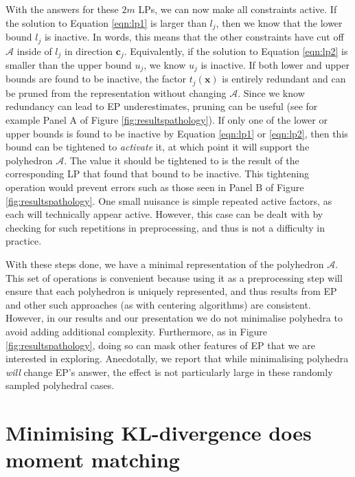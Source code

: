 \documentclass[twoside,11pt]{article}
\def\x{{\mathbf x}}
\def\c{{\mathbf c}}
\def\regionA{\mathcal{A}}
\begin{document}
With the answers for these $2m$ LPs, we can now make all constraints active.  If the solution to Equation \ref{eqn:lp1} is larger than $l_j$, then we know that the lower bound $l_j$ is inactive.  In words, this means that the other constraints have cut off $\regionA$ inside of $l_j$ in direction $\c_j$.  Equivalently, if the solution to Equation \ref{eqn:lp2} is smaller than the upper bound $u_j$, we know $u_j$ is inactive.  If both lower and upper bounds are found to be inactive, the factor $t_j(\x)$ is entirely redundant and can be pruned from the representation without changing $\regionA$.  Since we know redundancy can lead to EP underestimates, pruning can be useful (see for example Panel A of Figure \ref{fig:resultspathology}).  If only one of the lower or upper bounds is found to be inactive by Equation \ref{eqn:lp1} or \ref{eqn:lp2}, then this bound can be tightened to {\it activate} it, at which point it will support the polyhedron $\regionA$.   The value it should be tightened to is the result of the corresponding LP that found that bound to be inactive.  This tightening operation would prevent errors such as those seen in Panel B of Figure \ref{fig:resultspathology}.  One small nuisance is simple repeated active factors, as each will technically appear active.  However, this case can be dealt with by checking for such repetitions in preprocessing, and thus is not a difficulty in practice.  

With these steps done, we have a minimal representation of the polyhedron $\regionA$.  This set of operations is convenient because using it as a preprocessing step will ensure that each polyhedron is uniquely represented, and thus results from EP and other such approaches (as with centering algorithms) are consistent.  However,  in our results and our presentation we do not minimalise polyhedra to avoid adding additional complexity.  Furthermore, as in Figure \ref{fig:resultspathology}, doing so can mask other features of EP that we are interested in exploring.  Anecdotally, we report that while minimalising polyhedra \emph{will} change EP's answer, the effect is not particularly large in these randomly sampled polyhedral cases.   
   



\newpage


\section{Minimising KL-divergence does moment matching}
\label{sec:KL}
\end{document}
